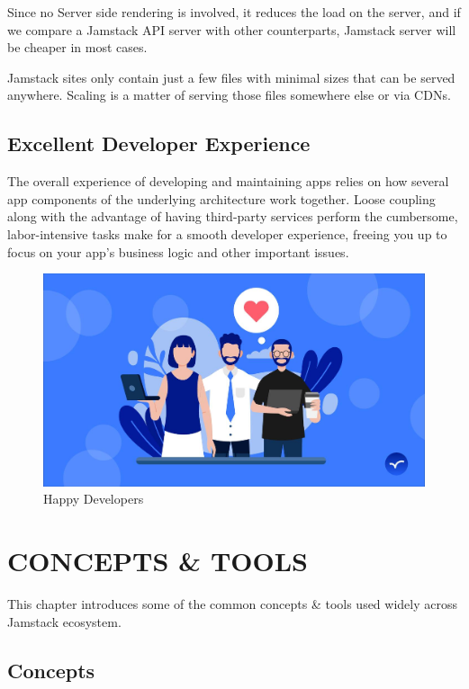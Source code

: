 \documentclass[12pt,a4paper,oneside]{report}
\begin{document}
\par 
Since no Server side rendering is involved, it reduces the load on the server, and if we compare a Jamstack API server with other counterparts, Jamstack server will be cheaper in most cases.

\par 
Jamstack sites only contain just a few files with minimal sizes that can be served anywhere. Scaling is a matter of serving those files somewhere else or via CDNs.

\section{Excellent Developer Experience}
\par 
The overall experience of developing and maintaining apps relies on how several app components of the underlying architecture work together. Loose coupling along with the advantage of having third-party services perform the cumbersome, labor-intensive tasks make for a smooth developer experience, freeing you up to focus on your app’s business logic and other important issues.

\begin{figure}[H]
    \centering
    \includegraphics[scale=.22]{images/happy-developer.png}
    \caption{Happy Developers\cite{happy}}
\end{figure}

\chapter{CONCEPTS \& TOOLS}
This chapter introduces some of the common concepts \& tools used widely across Jamstack ecosystem.
\section{Concepts}
\end{document}
